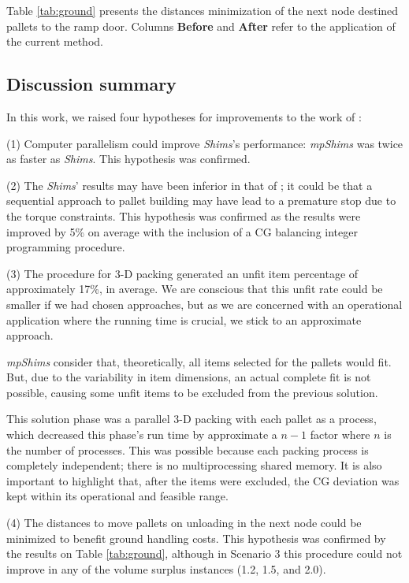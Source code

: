 \documentclass[preprint,authoryear]{elsarticle}
\begin{document}
Table \ref{tab:ground} presents the distances minimization of the next node destined pallets to the ramp door. Columns {\bf Before} and {\bf After} refer to the application of the current method.


\subsection{Discussion summary}

In this work, we raised four hypotheses for improvements to the work of \cite{MesquitaSanches2023}:

(1) Computer parallelism could improve {\it Shims}'s performance: {\it mpShims} was twice as faster as {\it Shims}. This hypothesis was confirmed.

(2) The {\it Shims}' results may have been inferior in that of \cite{MesquitaSanches2023}; it could be that a sequential approach to pallet building may have lead to a premature stop due to the torque constraints. This hypothesis was confirmed as the results were improved by 5\% on average with the inclusion of a CG balancing integer programming procedure.

(3) The procedure for 3-D packing generated an unfit item percentage of approximately 17\%, in average. 
We are conscious that this unfit rate could be smaller if we had chosen \cite{PaquayLimbourgSchynsOliveira2018} approaches, but as we are concerned with an operational application where the running time is crucial, we stick to an approximate approach.

{\it mpShims} consider that, theoretically, all items selected for the pallets would fit. But, due to the variability in item dimensions, an actual complete fit is not possible, causing some unfit items to be excluded from the previous solution.

This solution phase was a parallel 3-D packing with each pallet as a process, which decreased this phase's run time by approximate a $n-1$ factor where $n$ is the number of processes. This was possible because each packing process is completely independent; there is no multiprocessing shared memory. It is also important to highlight that, after the items were excluded, the CG deviation was kept within its operational and feasible range.

(4) The distances to move pallets on unloading in the next node could be minimized to benefit ground handling costs.
This hypothesis was confirmed by the results on Table \ref{tab:ground}, although in Scenario 3 this procedure could not improve in any of the volume surplus instances (1.2, 1.5, and 2.0).
\end{document}

